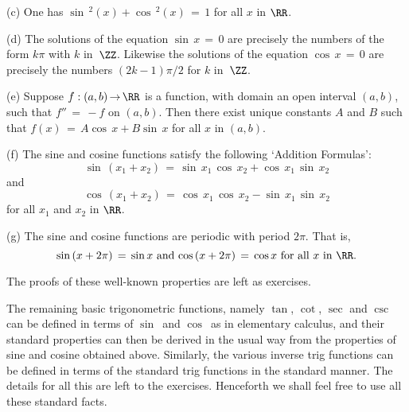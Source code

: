 \V

        (c) One has ${\sin}\,^{2}(x) + {\cos}\,^{2}(x) \,=\, 1$ for all $x$ in ${\RR}$.

\V

        (d) The solutions of the equation ${\sin}\,x \,=\, 0$ are precisely the numbers of the form $k{\pi}$ with $k$ in~${\ZZ}$.
    Likewise the solutions of the equation ${\cos}\,x \,=\, 0$ are precisely the numbers $(2k-1){\pi}/2$ for $k$ in~${\ZZ}$.

\V

        (e) Suppose $f:(a,b) \,{\rightarrow}\, {\RR}$ is a function, with domain an open interval $(a,b)$, such that $f'' \,=\, -f$ on $(a,b)$.
    Then there exist unique constants $A$ and $B$ such that $f(x) \,=\, A{\cos}\,x + B{\sin}\,x$ for all $x$ in $(a,b)$.

\V


        (f) The sine and cosine functions satisfy the following `Addition Formulas':
        \begin{displaymath}
        {\sin}\,(x_{1} + x_{2}) \,=\, {\sin}\,x_{1}\,{\cos}\,x_{2} + {\cos}\,x_{1}\,{\sin}\,x_{2}
        \end{displaymath}
    and
        \begin{displaymath}
        {\cos}\,(x_{1} + x_{2}) \,=\, {\cos}\,x_{1}\,{\cos}\,x_{2} - {\sin}\,x_{1}\,{\sin}\,x_{2}
        \end{displaymath}
    for all $x_{1}$ and $x_{2}$ in ${\RR}$.

\V

        (g) The sine and cosine functions are periodic with period $2{\pi}$.
    That is,
        \begin{displaymath}
        {\sin}\,(x+2{\pi}) \,=\, {\sin}\,x \mbox{ and } {\cos}\,(x+2{\pi}) \,=\, {\cos}\,x \mbox{ for all $x$ in ${\RR}$}.
        \end{displaymath}

        The proofs of these well-known properties are left as exercises. \Q

\V

        The remaining basic trigonometric functions, namely ${\tan}$, ${\cot}$, ${\sec}$ and ${\csc}$
    can be defined in terms of ${\sin}\,$ and ${\cos}\,$ as in elementary calculus, and their standard properties can then be derived in the usual way from the properties of sine and cosine obtained above.
    Similarly, the various inverse trig functions can be defined in terms of the standard trig functions in the standard manner.
    The details for all this are left to the exercises. Henceforth we shall feel free to use all these standard facts.

